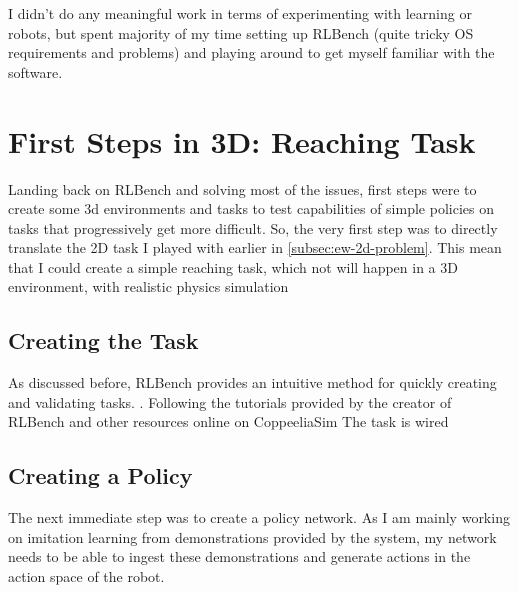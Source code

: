 I didn't do any meaningful work in terms of experimenting with learning or robots, but spent majority of my time setting up RLBench (quite tricky OS requirements and problems) and playing around to get myself familiar with the software. 



\section{First Steps in 3D: Reaching Task}
Landing back on RLBench and solving most of the issues, first steps were to create some 3d environments and tasks to test capabilities of simple policies on tasks that progressively get more difficult. So, the very first step was to directly translate the 2D task I played with earlier in \ref{subsec:ew-2d-problem}. This mean that I could create a simple reaching task, which not will happen in a 3D environment, with realistic physics simulation

\subsection{Creating the Task}
As discussed before, RLBench provides an intuitive method for quickly creating and validating tasks. . Following the tutorials provided by the creator of RLBench and other resources online on CoppeeliaSim  The task is wired

\begin{figure}
\end{figure}

\subsection{Creating a Policy}

The next immediate step was to create a policy network. As I am mainly working on imitation learning from demonstrations provided by the system, my network needs to be able to ingest these demonstrations and generate actions in the action space of the robot.\\

\vspace{0.3cm}

